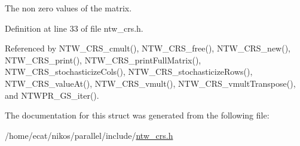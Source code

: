 The non zero values of the matrix. 

Definition at line 33 of file ntw\+\_\+crs.\+h.



Referenced by N\+T\+W\+\_\+\+C\+R\+S\+\_\+cmult(), N\+T\+W\+\_\+\+C\+R\+S\+\_\+free(), N\+T\+W\+\_\+\+C\+R\+S\+\_\+new(), N\+T\+W\+\_\+\+C\+R\+S\+\_\+print(), N\+T\+W\+\_\+\+C\+R\+S\+\_\+print\+Full\+Matrix(), N\+T\+W\+\_\+\+C\+R\+S\+\_\+stochasticize\+Cols(), N\+T\+W\+\_\+\+C\+R\+S\+\_\+stochasticize\+Rows(), N\+T\+W\+\_\+\+C\+R\+S\+\_\+value\+At(), N\+T\+W\+\_\+\+C\+R\+S\+\_\+vmult(), N\+T\+W\+\_\+\+C\+R\+S\+\_\+vmult\+Transpose(), and N\+T\+W\+P\+R\+\_\+\+G\+S\+\_\+iter().



The documentation for this struct was generated from the following file\+:\begin{DoxyCompactItemize}
\item 
/home/ecat/nikos/parallel/include/\mbox{\hyperlink{ntw__crs_8h}{ntw\+\_\+crs.\+h}}\end{DoxyCompactItemize}
